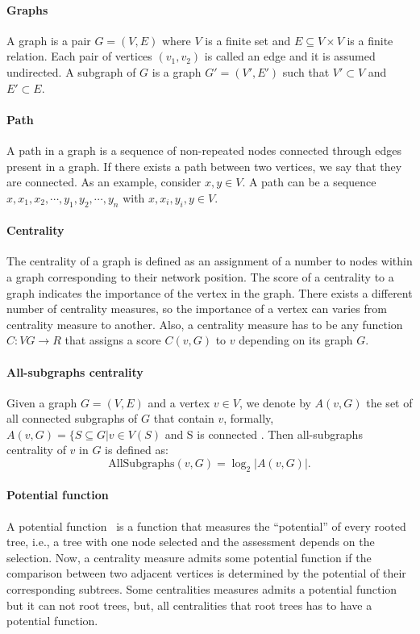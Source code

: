 

\paragraph{Graphs} A graph is a pair $G = (V, E)$ where $V$ is a finite set and $E \subseteq V\times V$ is a finite relation. Each pair of vertices $(v_{1},v_{2})$ is called an edge and it is assumed undirected. A subgraph of $G$ is a graph $G'=(V', E')$ such that $V' \subset V$ and $E' \subset E$.

\paragraph{Path} A path in a graph is a sequence of non-repeated nodes connected through edges present in a graph. If there exists a path between two vertices, we say that they are connected. As an example, consider $x,y \in V$. A path can be a sequence $x,x_{1},x_{2},\cdots,y_{1},y_{2},\cdots,y_{n}$ with $x,x_{i},y_{i},y \in V$.


\paragraph{Centrality} The centrality of a graph is defined as an assignment of a number to nodes within a graph corresponding to their network position. The score of a centrality to a graph indicates the importance of the vertex in the graph. There exists a different number of centrality measures, so the importance of a vertex can varies from centrality measure to another. Also, a centrality measure has to be any function $C : VG \rightarrow R$ that assigns a score $C(v, G)$ to $v$ depending on its graph $G$. 

\paragraph{All-subgraphs centrality} Given a graph $G = (V, E)$ and a vertex $v \in V$, we denote by $A(v, G)$ the set of all connected subgraphs of $G$ that contain $v$, formally, $A(v, G) = \{S \subseteq G | v \in V (S)$ and S is connected \cite{RiverosS20}. Then all-subgraphs centrality of $v$ in $G$ is defined
as: 
$$
\text{AllSubgraphs}(v, G) = \log_{2}{|A(v, G)|}.
$$

\paragraph{Potential function} A potential function~\cite{RiverosSS23} is a function that measures the “potential” of every rooted tree, i.e.,
a tree with one node selected and the assessment depends on the selection. Now, a centrality measure admits some potential function if the comparison between two adjacent vertices is determined by the potential of their corresponding subtrees. Some centralities measures admits a potential function but it can not root trees, but, all centralities that root trees has to have a potential function.

